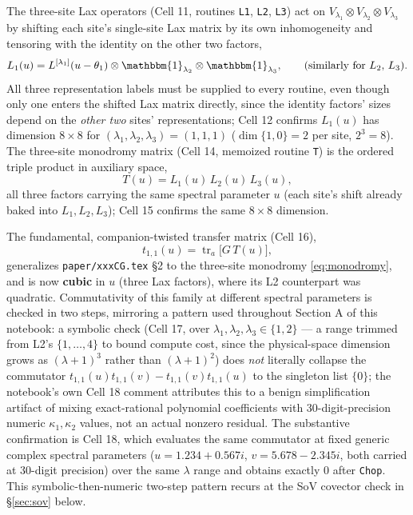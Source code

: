 \documentclass[11pt]{article}
\begin{document}
The three-site Lax operators (Cell 11, routines \texttt{L1}, \texttt{L2}, \texttt{L3}) act on
$V_{\lambda_1}\otimes V_{\lambda_2}\otimes V_{\lambda_3}$ by shifting each site's single-site Lax
matrix by its own inhomogeneity and tensoring with the identity on the other two factors,
\[
  L_1(u) = L^{[\lambda_1]}(u-\theta_1)\otimes \mathbbm{1}_{\lambda_2}\otimes\mathbbm{1}_{\lambda_3},
  \qquad\text{(similarly for $L_2$, $L_3$).}
\]
All three representation labels must be supplied to every routine, even though only one enters the
shifted Lax matrix directly, since the identity factors' sizes depend on the \emph{other two} sites'
representations; Cell 12 confirms $L_1(u)$ has dimension $8\times8$ for
$(\lambda_1,\lambda_2,\lambda_3)=(1,1,1)$ ($\dim\{1,0\}=2$ per site, $2^3=8$). The three-site
monodromy matrix (Cell 14, memoized routine \texttt{T}) is the ordered triple product in auxiliary
space,
\begin{equation}
  T(u) = L_1(u)\, L_2(u)\, L_3(u),
  \label{eq:monodromy}
\end{equation}
all three factors carrying the same spectral parameter $u$ (each site's shift already baked into
$L_1,L_2,L_3$); Cell 15 confirms the same $8\times8$ dimension.

The fundamental, companion-twisted transfer matrix (Cell 16),
\begin{equation}
  t_{1,1}(u) = \operatorname{tr}_a\!\bigl[G\,T(u)\bigr],
  \label{eq:t11}
\end{equation}
generalizes \texttt{paper/xxxCG.tex} \S2 to the three-site monodromy \eqref{eq:monodromy}, and is now
\textbf{cubic} in $u$ (three Lax factors), where its L2 counterpart was quadratic. Commutativity of
this family at different spectral parameters is checked in two steps, mirroring a pattern used
throughout Section A of this notebook: a symbolic check (Cell 17, over
$\lambda_1,\lambda_2,\lambda_3\in\{1,2\}$ --- a range trimmed from L2's $\{1,\dots,4\}$ to bound
compute cost, since the physical-space dimension grows as $(\lambda+1)^3$ rather than $(\lambda+1)^2$)
does \emph{not} literally collapse the commutator $t_{1,1}(u)t_{1,1}(v)-t_{1,1}(v)t_{1,1}(u)$ to the
singleton list $\{0\}$; the notebook's own Cell 18 comment attributes this to a benign
simplification artifact of mixing exact-rational polynomial coefficients with 30-digit-precision
numeric $\kappa_1,\kappa_2$ values, not an actual nonzero residual. The substantive confirmation is
Cell 18, which evaluates the same commutator at fixed generic complex spectral parameters
($u=1.234+0.567i$, $v=5.678-2.345i$, both carried at 30-digit precision) over the same $\lambda$
range and obtains exactly $0$ after \texttt{Chop}. This symbolic-then-numeric two-step pattern recurs
at the SoV covector check in \S\ref{sec:sov} below.
\end{document}
